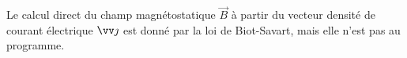 \documentclass[12pt,fancy]{cours}
\begin{document}





\begin{remarque}
Le calcul direct du champ magnétostatique $\Vec{B}$ à partir du vecteur densité de courant électrique $\j$ est donné par la loi de Biot-Savart, mais elle n’est pas au programme.
\end{remarque}
\end{document}
